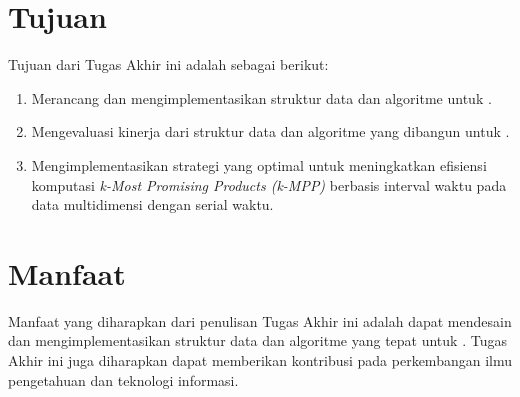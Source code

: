 \section{Tujuan}
\tab Tujuan dari Tugas Akhir ini adalah sebagai berikut:

\begin{enumerate}
	\item Merancang dan mengimplementasikan struktur data dan algoritme untuk \problem.
	\item Mengevaluasi kinerja dari struktur data dan algoritme yang dibangun untuk \problem.
	\item Mengimplementasikan strategi yang optimal untuk meningkatkan efisiensi komputasi \textit{k-Most Promising Products (k-MPP)} berbasis interval waktu pada data multidimensi dengan serial waktu.
\end{enumerate}

\section{Manfaat}
\tab Manfaat yang diharapkan dari penulisan Tugas Akhir ini adalah dapat mendesain dan mengimplementasikan struktur data dan algoritme yang tepat untuk \problem. Tugas Akhir ini juga diharapkan dapat memberikan kontribusi pada perkembangan ilmu pengetahuan dan teknologi informasi.

